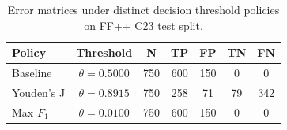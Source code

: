 \begin{table}[ht]
\centering\small
\begin{tabular}{lcccccc}
\toprule
Policy & Threshold & N & TP & FP & TN & FN \\
\midrule
Baseline & $\theta=0.5000$ & 750 & 600 & 150 & 0 & 0 \\
Youden's J & $\theta=0.8915$ & 750 & 258 & 71 & 79 & 342 \\
Max $F_1$ & $\theta=0.0100$ & 750 & 600 & 150 & 0 & 0 \\
\bottomrule
\end{tabular}
\caption{Error matrices under distinct decision threshold policies on FF++ C23 test split.}
\label{tab:error_analysis}
\end{table}
